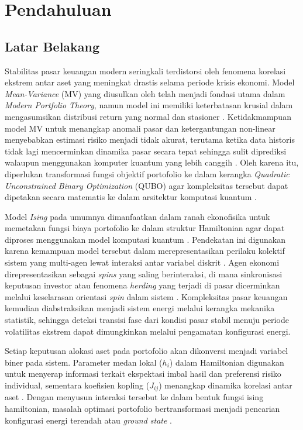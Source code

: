 \chapter{Pendahuluan}

\section{Latar Belakang}
Stabilitas pasar keuangan modern seringkali terdistorsi oleh fenomena korelasi ekstrem antar aset yang meningkat drastis selama periode krisis ekonomi. Model \textit{Mean-Variance} (MV) yang diusulkan oleh \cite{markowitz_portfolio_1952} telah menjadi fondasi utama dalam \textit{Modern Portfolio Theory}, namun model ini memiliki keterbatasan krusial dalam mengasumsikan distribusi return yang normal dan stasioner \cite{abdul_hali_markowitz_2020}. Ketidakmampuan model MV untuk menangkap anomali pasar dan ketergantungan non-linear menyebabkan estimasi risiko menjadi tidak akurat, terutama ketika data historis tidak lagi mencerminkan dinamika pasar secara tepat sehingga sulit diprediksi walaupun menggunakan komputer kuantum yang lebih canggih \cite{sikalo_efficient_2022}. Oleh karena itu, diperlukan transformasi fungsi objektif portofolio ke dalam kerangka \textit{Quadratic Unconstrained Binary Optimization} (QUBO) agar kompleksitas tersebut dapat dipetakan secara matematis ke dalam arsitektur komputasi kuantum \cite{wang_achieving_2025}.

Model \textit{Ising} pada umumnya dimanfaatkan dalam ranah ekonofisika untuk memetakan fungsi biaya portofolio ke dalam struktur Hamiltonian agar dapat diproses menggunakan model komputasi kuantum \cite{lucas_ising_2014}. Pendekatan ini digunakan karena kemampuan model tersebut dalam merepresentasikan perilaku kolektif sistem yang multi-agen lewat interaksi antar variabel diskrit \cite{mantegna_introduction_2000}. Agen ekonomi direpresentasikan sebagai \textit{spins} yang saling berinteraksi, di mana sinkronisasi keputusan investor atau fenomena \textit{herding} yang terjadi di pasar dicerminkan melalui keselarasan orientasi \textit{spin} dalam sistem \cite{hidalgo_quantum_2006}. Kompleksitas pasar keuangan kemudian diabstraksikan menjadi sistem energi melalui kerangka mekanika statistik, sehingga deteksi transisi fase dari kondisi pasar stabil menuju periode volatilitas ekstrem dapat dimungkinkan melalui pengamatan konfigurasi energi.

Setiap keputusan alokasi aset pada portofolio akan dikonversi menjadi variabel biner pada sistem. Parameter medan lokal ($h_i$) dalam Hamiltonian digunakan untuk menyerap informasi terkait ekspektasi imbal hasil dan preferensi risiko individual, sementara koefisien kopling ($J_{ij}$) menangkap dinamika korelasi antar aset \cite{sikalo_efficient_2022}. Dengan menyusun interaksi tersebut ke dalam bentuk fungsi ising hamiltonian, masalah optimasi portofolio bertransformasi menjadi pencarian konfigurasi energi terendah atau \textit{ground state} \cite{wei_solving_2025}. 

